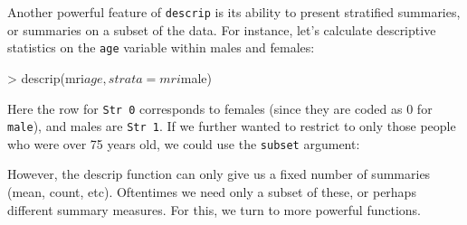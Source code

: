 \documentclass[landscape]{article}
\renewenvironment{Schunk}{\vspace{\topsep}}{\vspace{\topsep}}
\begin{document}
Another powerful feature of \texttt{descrip} is its ability to present stratified summaries, or summaries on a subset of the data. For instance, let's calculate descriptive statistics on the \texttt{age} variable within males and females:
\begin{Schunk}
\begin{Sinput}
> descrip(mri$age, strata = mri$male)
\end{Sinput}
\end{Schunk}

Here the row for \texttt{Str 0} corresponds to females (since they are coded as 0 for \texttt{male}), and males are \texttt{Str 1}. If we further wanted to restrict to only those people who were over 75 years old, we could use the \texttt{subset} argument:
\begin{Schunk}
\end{Schunk}

However, the descrip function can only give us a fixed number of summaries (mean, count, etc). Oftentimes we need only a subset of these, or perhaps different summary measures. For this, we turn to more powerful functions.
\end{document}
